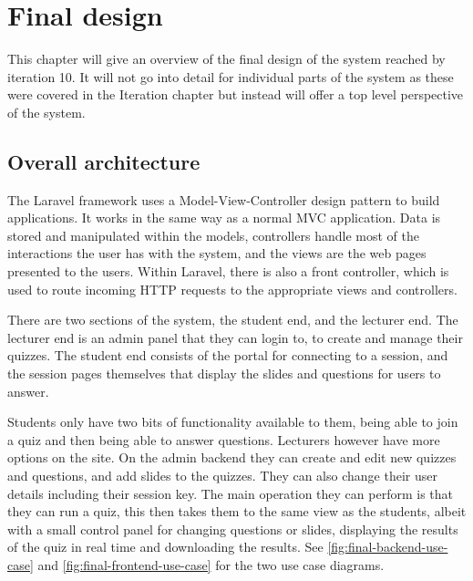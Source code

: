 \chapter{Final design}
This chapter will give an overview of the final design of the system reached by iteration 10. It will not go into detail for individual parts of the system as these were covered in the Iteration chapter but instead will offer a top level perspective of the system.

\section{Overall architecture}
The Laravel framework uses a Model-View-Controller design pattern\cite{mvc} to build applications. It works in the same way as a normal MVC application. Data is stored and manipulated within the models, controllers handle most of the interactions the user has with the system, and the views are the web pages presented to the users. Within Laravel, there is also a front controller, which is used to route incoming HTTP requests to the appropriate views and controllers\cite{Laravel-architechture}.

There are two sections of the system, the student end, and the lecturer end. The lecturer end is an admin panel that they can login to, to create and manage their quizzes. The student end consists of the portal for connecting to a session, and the session pages themselves that display the slides and questions for users to answer.

Students only have two bits of functionality available to  them, being able to join a quiz and then being able to answer questions. Lecturers however have more options on the site. On the admin backend they can create and edit new quizzes and questions, and add slides to the quizzes. They can also change their user details including their session key. The main operation they can perform is that they can run a quiz, this then takes them to the same view as the students, albeit with a small control panel for changing questions or slides, displaying the results of the quiz in real time and downloading the results. See \ref{fig:final-backend-use-case} and \ref{fig:final-frontend-use-case} for the two use case diagrams.

